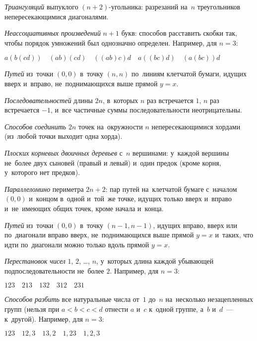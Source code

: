 \begin{problems}

\item
\emph{Триангуляций} выпуклого $(n + 2)$-угольника:
разрезаний на~$n$ треугольников непересекающимися диагоналями.

\item
\emph{Неассоциативных произведений} $n + 1$ букв:
способов расставить скобки так, чтобы порядок умножений был однозначно
определен.
Например, для $n = 3$:
\begin{center} \(
    a(b(cd)) \quad (ab)(cd) \quad ((ab)c)d \quad a((bc)d) \quad (a(bc))d
\) \end{center}

\item
\emph{Путей} из~точки $(0, 0)$ в~точку $(n, n)$ по~линиям клетчатой бумаги,
идущих вверх и~вправо, не~поднимающихся выше прямой $y = x$.

\item
\emph{Последовательностей} длины $2n$, в~которых $n$ раз встречается $1$,
$n$ раз встречается $-1$, и~все частичные суммы последовательности
неотрицательны.

\item
\emph{Способов соединить} $2 n$ точек на~окружности $n$ непересекающимися
хордами (из~любой точки выходит одна хорда).

\item
\emph{Плоских корневых двоичных деревьев} с~$n$ вершинами:
у~каждой вершины не~более двух сыновей (правый и левый) и~один предок
(кроме корня, у~которого нет предков).

\item
\emph{Параллеломино} периметра $2n+2$:
пар путей на~клетчатой бумаге с~началом $(0, 0)$ и~концом в~одной и~той~же
точке, идущих только вверх и~вправо и~не~имеющих общих точек, кроме начала
и~конца.

\item
\emph{Путей} из~точки $(0, 0)$ в~точку $(n - 1, n - 1)$, идущих
вправо, вверх или по~диагонали вправо вверх, не~поднимающихся выше
прямой $y = x$ и~таких, что идти по~диагонали можно только вдоль прямой
$y = x$.

\item
\emph{Перестановок чисел} $1$, $2$, \ldots, $n$, у~которых длина каждой
убывающей подпоследовательности не~более $2$.
Например, для $n = 3$:
\begin{center} \(
    123 \quad 213 \quad 132 \quad 312 \quad 231
\) \end{center}

\item
\emph{Способов разбить} все натуральные числа от~$1$ до~$n$ на~несколько
незацепленных групп (нельзя при $a < b < c < d$ отнести $a$ и~$c$ к~одной
группе, а~$b$ и~$d$~--- к~другой).
Например, для $n = 3$:
\begin{center} \(
    123 \quad 12,3 \quad 13,2 \quad 1,23 \quad 1,2,3
\) \end{center}

\end{problems}

